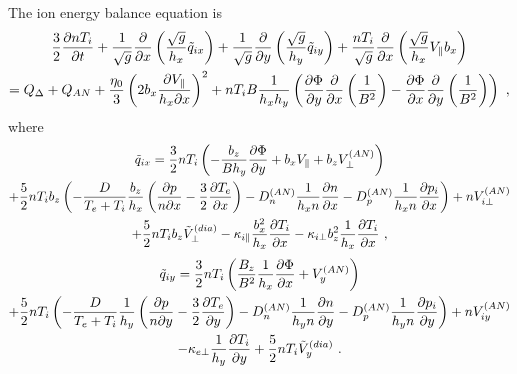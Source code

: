 \documentclass[a4paper,10pt]{report}
\begin{document}
The ion energy balance equation is
\begin{multline}\label{eq:ion_energy} \hfill
     \frac{3}{2} \frac{\partial nT_i}{\partial t} +
     \frac{1}{\sqrt{g}} \frac{\partial }{\partial x}
      \left(\frac{\sqrt{g}}{h_x} \tilde{q}_{ix}\right) +
     \frac{1}{\sqrt{g}} \frac{\partial }{\partial y}
      \left(\frac{\sqrt{g}}{h_y} \tilde{q}_{iy}\right) +
     \frac{nT_i}{\sqrt{g}}\frac{\partial }{\partial x}
      \left(\frac{\sqrt{g}}{h_x} V_{\parallel} b_x \right) \hfill \\
     \hfill =
     Q_{\Delta} + Q_{AN} + \frac{\eta _0}{3} \left(2 b_x
     \frac{\partial V_{\parallel}}{h_x \partial x}\right)^2+
     n T_i B
     \frac{1}{h_x h_y}\left(\frac{\partial \Phi}{\partial y}
     \frac{\partial}{\partial x}\left(\frac{1}{B^2}\right)
     -\frac{\partial \Phi}{\partial x}\frac{\partial}{\partial y}
     \left(\frac{1}{B^2}\right)\right)~,\hfill
\end{multline}
where
\begin{multline} \hfill
        \tilde{q}_{ix} = \frac{3}{2} n T_i \left(- \frac{b_z}{B h_y}
        \frac{\partial \Phi}{\partial y}
         + b_x V_{\parallel} + b_z V_{\perp}^{(AN)} \right) \hfill \\
\hfill + \frac{5}{2} n T_i b_z\left(
     - \frac{D}{T_e+T_i} \frac{b_z}{h_x}\left(\frac{\partial p}{n \partial x}
     - \frac{3}{2} \frac{\partial T_e}{\partial x} \right)
     - D^{(AN)}_n \frac{1}{h_x n} \frac{\partial n}{\partial x}
     - D^{(AN)}_p \frac{1}{h_x n} \frac{\partial p_i}{\partial x}\right)
     + n V_{i\perp}^{(AN)}
         \hfill \\ \hfill
         + \frac{5}{2} n T_i b_z \tilde{V} _{\perp}^{\left(dia\right)}
         - \kappa _{i \parallel}
         \frac{b_x^2}{h_x} \frac{\partial T_i}{\partial x}
         - \kappa _{i \perp} b_z^2 \frac{1}{h_x}
         \frac{\partial T_i}{\partial x} ~, \hfill
\end{multline}
\begin{multline} \hfill
        \tilde{q}_{iy} = \frac{3}{2} n T_i \left( \frac{B_z}{B^2}
         \frac{1}{h_x} \frac{\partial \Phi}{\partial x} + V_{y}^{(AN)} \right)
        \hfill \\ \hfill
     + \frac{5}{2} n T_i \left(
     - \frac{D}{T_e+T_i} \frac{1}{h_y} \left( \frac{\partial p}{n \partial y}
     - \frac{3}{2} \frac{\partial T_e}{\partial y}\right)
     - D^{(AN)}_n \frac{1}{h_y n} \frac{\partial n}{\partial y}
     - D^{(AN)}_p \frac{1}{h_y n} \frac{\partial p_i}{\partial y} \right)
     + n V_{iy}^{(AN)} \hfill \\ \hfill
         - \kappa _{e \perp} \frac{1}{h_y}
         \frac{\partial T_i}{\partial y}
         + \frac{5}{2} n T_i \tilde{V} _{y}^{\left(dia\right)} ~. \hfill
\end{multline}
\end{document}
